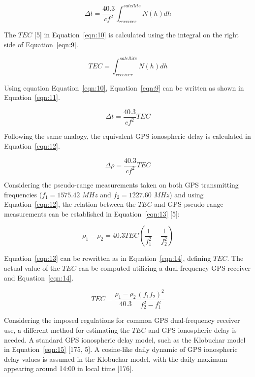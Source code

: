 \documentclass[sn-mathphys-num]{sn-jnl}%
\begin{document}
\begin{equation}
	\Delta t = \frac{40.3}{c f^{2}} \int_{receiver}^{satellite} N(h)dh
	\label{eqn:9}
\end{equation}

The $TEC$ [5] in Equation~\ref{eqn:10} is calculated using the integral on the right side of Equation~\ref{eqn:9}.

\begin{equation}
	TEC = \int_{receiver}^{satellite} N(h)dh
	\label{eqn:10}
\end{equation}

Using equation Equation~\ref{eqn:10}, Equation~\ref{eqn:9} can be written as shown in Equation~\ref{eqn:11}.

\begin{equation}
	\Delta t = \frac{40.3}{c f^{2}} TEC
	\label{eqn:11}
\end{equation}

Following the same analogy, the equivalent GPS ionospheric delay is calculated in Equation~\ref{eqn:12}.

\begin{equation}
	\Delta \rho = \frac{40.3}{c f^{2}} TEC
	\label{eqn:12}
\end{equation}

Considering the pseudo-range measurements taken on both GPS transmitting frequencies ($f_{1}=1575.42$ $MHz$ and $f_{2}=1227.60$ $MHz$) and using Equation~\ref{eqn:12}, the relation between the $TEC$ and GPS pseudo-range measurements can be established in Equation~\ref{eqn:13} [5]:
 
\begin{equation}
	\rho_{1} - \rho_{2} = 40.3 TEC \left( \frac{1}{f_{1}^{2}} - \frac{1}{f_{2}^{2}} \right)
	\label{eqn:13}
\end{equation}

Equation~\ref{eqn:13} can be rewritten as in Equation~\ref{eqn:14}, defining $TEC$. The actual value of the $TEC$ can be computed utilizing a dual-frequency GPS receiver and Equation~\ref{eqn:14}.

\begin{equation}
	TEC = \frac{\rho_{1} - \rho_{2}}{40.3} \frac{{\left(f_{1}f_{2}\right)}^{2}}{f_{2}^{2}-f_{1}^{2}}
	\label{eqn:14}
\end{equation}

Considering the imposed regulations for common GPS dual-frequency receiver use, a different method for estimating the $TEC$ and GPS ionospheric delay is needed. A standard GPS ionospheric delay model, such as the Klobuchar model in Equation~\ref{eqn:15} [175, 5]. A cosine-like daily dynamic of GPS ionospheric delay values is assumed in the Klobuchar model, with the daily maximum appearing around 14:00 in local time [176].
\end{document}
